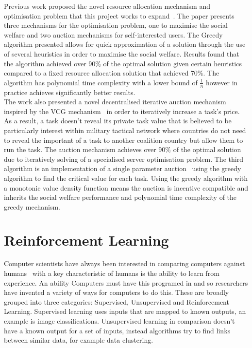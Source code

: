 Previous work proposed the novel resource allocation mechanism and optimisation problem that this project works to
expand~\citep{FlexibleResourceAllocation}. The paper presents three mechanisms for the optimisation problem,
one to maximise the social welfare and two auction mechanisms for self-interested users. The Greedy algorithm presented
allows for quick approximation of a solution through the use of several heuristics in order to maximise the social
welfare. Results found that the algorithm achieved over 90\% of the optimal solution given certain heuristics compared
to a fixed resource allocation solution that achieved 70\%. The algorithm has polynomial time complexity with a lower
bound of $\frac{1}{n}$ however in practice achieves significantly better results. \\
The work also presented a novel decentralised iterative auction mechanism inspired by the VCG
mechanism~\citep{vickrey, Clarke, groves} in order to iteratively increase a task's price. As a result, a task doesn't
reveal its private task value that is believed to be particularly interest within military tactical network where countries
do not need to reveal the important of a task to another coalition country but allow them to run the task. The auction
mechanism achieves over 90\% of the optimal solution due to iteratively solving of a specialised server optimisation problem.
The third algorithm is an implementation of a single parameter auction~\citep{nisan2007algorithmic_critical_value} using
the greedy algorithm to find the critical value for each task. Using the greedy algorithm with a monotonic value density
function means the auction is incentive compatible and inherits the social welfare performance and polynomial time
complexity of the greedy mechanism.

\section{Reinforcement Learning}\label{sec:reinforcement-learning}
Computer scientists have always been interested in comparing computers against humans~\citep{turing1950computing} with a
key characteristic of humans is the ability to learn from experience. An ability Computers must have this programed in
and so researchers have invented a variety of ways for computers to do this. These are broadly
grouped into three categories: Supervised, Unsupervised and Reinforcement Learning. Supervised learning uses inputs
that are mapped to known outputs, an example is image classifications. Unsupervised learning in comparison doesn't have
a known output for a set of inputs, instead algorithms try to find links between similar data, for example data
clustering.

